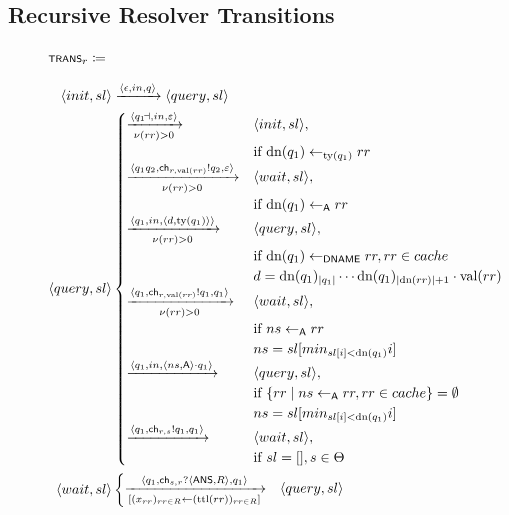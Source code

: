 \documentclass[english,acmsmall, screen, nonacm]{acmart}
\theoremstyle{plain}
\theoremstyle{definition}
\theoremstyle{remark}
\begin{document}
\newpage

\subsection{Recursive Resolver Transitions\label{appx:rec-full-trans}}

\begin{figure}[h]
	$\scrsf{trans}_{r}\coloneqq$
	
	\begin{gather}
		\begin{align*}
			\tup{init,sl} & \xrightarrow{\tup{\epsilon,in,q}}\tup{query,sl}\\
			\tup{query,sl} & \begin{cases}
				\xrightarrow[\nu(rr) > 0]{\tup{q_1\,\,\bottom,in,\varepsilon}} & \tup{init,sl},\\
				& \text{if }\text{dn}(q_{1})\leftarrow_{\text{ty}(q_{1})}rr\\
				\xrightarrow[\nu(rr) > 0]{\tup{q_1q_2,\ch_{r,\text{val}(rr)}!q_{2},\varepsilon}} & \tup{wait,sl},\\
				& \text{if }\text{dn}(q_{1})\leftarrow_{\scrsf{a}}rr\\
				\xrightarrow[\nu(rr) > 0]{\tup{q_1,in,\tup{d,\text{ty}(q_1)}}} & \tup{query,sl},\\
				& \text{if }\text{dn}(q_{1})\leftarrow_{\scrsf{dname}}rr,rr\in cache\\
				& d=\text{dn}(q_{1})_{|q_{1}|}\cdots\text{dn}(q_{1})_{|\text{dn}(rr)|+1}\cdot\text{val}(rr)\\
				\xrightarrow[\nu(rr) > 0]{\tup{q_1, \ch_{r,\text{val}(rr)}!q_{1}, q_1}} & \tup{wait,sl},\\
				& \text{if }ns\leftarrow_{\scrsf{a}}rr\\
				& ns = sl[min_{sl[i] < \text{dn}(q_1)} i]\\
				\xrightarrow{\tup{q_1, in, \tup{ns,\scrsf{a}} \cdot q_1}} & \tup{query,sl},\\
				& \text{if }\{rr\mid ns\leftarrow_{\scrsf{a}}rr,rr\in cache\}=\emptyset\\
				& ns = sl[min_{sl[i] < \text{dn}(q_1)} i]\\
				\xrightarrow{\tup{q_1, \ch_{r,s}!q_1, q_1}} & \tup{wait,sl},\\
				& \text{if }sl = [], s \in \Theta
			\end{cases}\\
			\tup{wait,sl} & \begin{cases}
				\xrightarrow[{[(x_{rr})_{rr\in R}\leftarrow (\text{ttl}(rr))_{rr\in R}]}]{\tup{q_1, \ch_{s,r}?\tup{\scrsf{ans},R},q_1}} & \tup{query,sl}\\

\end{cases}
\end{align*}
\end{gather}
\end{figure}
\end{document}

